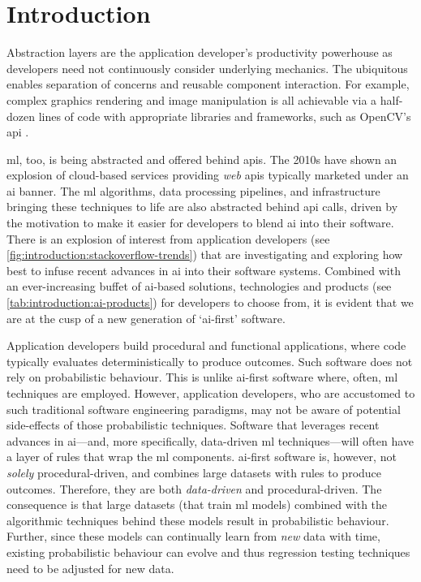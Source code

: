 \chapter{Introduction}
\label{ch:introduction}
\graphicspath{{mainmatter/introduction/figures/}}

\glsresetall

Abstraction layers are the application developer's productivity powerhouse as developers need not continuously consider underlying mechanics. The ubiquitous  enables separation of concerns and reusable component interaction. For example, complex graphics rendering and image manipulation is all achievable via a half-dozen lines of code with appropriate libraries and frameworks, such as OpenCV's \gls{api} \citep{opencv_library}.

\Gls{ml}, too, is being abstracted and offered behind \glspl{api}. The 2010s have shown an explosion of cloud-based services providing \textit{web} \glspl{api} typically marketed under an \gls{ai} banner. The \gls{ml} algorithms, data processing pipelines, and infrastructure bringing these techniques to life are also abstracted behind \gls{api} calls, driven by the motivation to make it easier for developers to blend \gls{ai} into their software.
There is an explosion of interest from application developers (see \cref{fig:introduction:stackoverflow-trends}) that are investigating and exploring how best to infuse recent advances in \gls{ai} into their software systems. Combined with an ever-increasing buffet of \gls{ai}-based solutions, technologies and products (see \cref{tab:introduction:ai-products}) for developers to choose from, it is evident that we are at the cusp of a new generation of `\gls{ai}-first' software.

Application developers build procedural and functional applications, where code typically evaluates deterministically to produce outcomes. Such software does not rely on probabilistic behaviour. This is unlike \gls{ai}-first software where, often, \gls{ml} techniques are employed. However, application developers, who are accustomed to such traditional software engineering paradigms, may not be aware of potential side-effects of those probabilistic techniques. Software that leverages recent advances in \gls{ai}---and, more specifically, data-driven \gls{ml} techniques---will often have a layer of rules that wrap the \gls{ml} components.
\Gls{ai}-first software is, however, not \textit{solely} procedural-driven, and combines large datasets with rules to produce outcomes. Therefore, they are both \textit{data-driven} and procedural-driven. The consequence is that large datasets (that train \gls{ml} models) combined with the algorithmic techniques behind these models result in probabilistic behaviour. Further, since these models can continually learn from \textit{new} data with time, existing probabilistic behaviour can evolve and thus regression testing techniques need to be adjusted for new data. 

